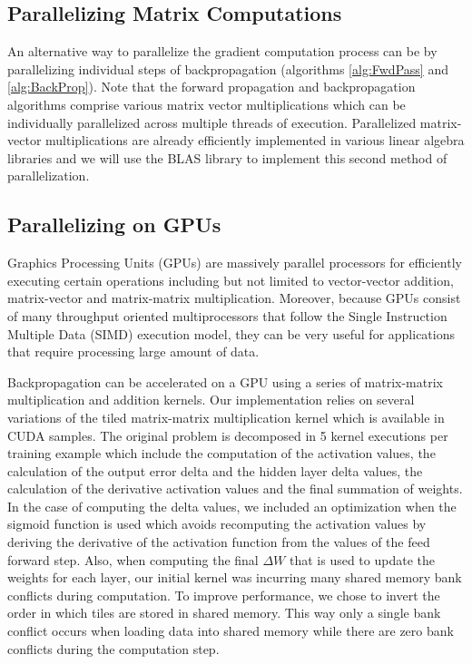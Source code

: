 \subsection{Parallelizing Matrix Computations}
\label{sub:ParMatComp}

An alternative way to parallelize the gradient computation process can be by parallelizing individual steps of backpropagation (algorithms \ref{alg:FwdPass} and \ref{alg:BackProp}).
Note that the forward propagation and backpropagation algorithms comprise various matrix vector multiplications which can be individually parallelized across multiple threads of execution.
Parallelized matrix-vector multiplications are already efficiently implemented in various linear algebra libraries and we will use the BLAS library to implement this second method of parallelization.

\subsection{Parallelizing on GPUs}
\label{sub:GPU}

Graphics Processing Units (GPUs) are massively parallel processors for efficiently executing certain operations including but not limited to vector-vector addition, matrix-vector and matrix-matrix multiplication. Moreover, because GPUs consist of many throughput oriented multiprocessors that follow the Single Instruction Multiple Data (SIMD) execution model, they can be very useful for applications that require processing large amount of data.

Backpropagation can be accelerated on a GPU using a series of matrix-matrix multiplication and addition kernels. Our implementation relies on several variations of the tiled matrix-matrix multiplication kernel which is available in CUDA samples. The original problem is decomposed in 5 kernel executions per training example which include the computation of the activation values, the calculation of the output error delta and the hidden layer delta values, the calculation of the derivative activation values and the final summation of weights. In the case of computing the delta values, we included an optimization when the sigmoid function is used which avoids recomputing the activation values by deriving the derivative of the activation function from the values of the feed forward step. Also, when computing the final $\Delta W$ that is used to update the weights for each layer, our initial kernel was incurring many shared memory bank conflicts during computation. To improve performance, we chose to invert the order in which tiles are stored in shared memory. This way only a single bank conflict occurs when loading data into shared memory while there are zero bank conflicts during the computation step.

